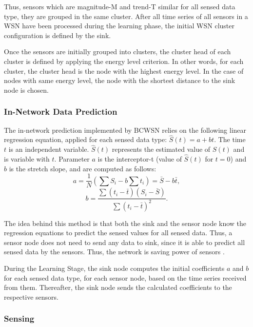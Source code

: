 \documentclass{acm_proc_article-sp}
\begin{document}
Thus, sensors which are magnitude-M and trend-T similar for all sensed data
type, they are grouped in the same cluster. After all time series of all sensors
in a WSN have been processed during the learning phase, the initial WSN cluster
configuration is defined by the sink.

Once the sensors are initially grouped into clusters, the cluster head of each
cluster is defined by applying the energy level criterion.
In other words, for each cluster, the cluster head is the node with the highest
energy level. In the case of nodes with same energy level, the node with the
shortest distance to the sink node is chosen.


\subsubsection{In-Network Data Prediction}
\label{data-predict}

The in-network prediction implemented by BCWSN relies on the
following linear regression equation, applied for each sensed data type:
$\hat{S}(t) = a + bt$.
The time $t$ is an independent variable. $\hat{S}(t)$ represents the estimated
value of $S(t)$ and is variable with $t$. Parameter $a$ is the interceptor-t
(value of $\hat{S}(t)$ for $t=0$) and $b$ is the stretch slope, and are computed
as follows:
\begin{equation}
	a = \frac{1}{N}\left(\sum S_{i} - b\sum t_{i} \right) = \bar{S} - b\bar{t},
\end{equation}
\vspace*{-.3cm}
\begin{equation}
	b = \frac{\sum \left(t_{i} - \bar{t}\right)\left(S_{i} - \bar{S}\right)}{\sum \left(t_{i} - \bar{t}\right)^{2}}.
\end{equation}

The idea behind this method is that both the sink and the sensor node know the
regression equations to predict the sensed values for all sensed data. Thus, a
sensor node does not need to send any data to sink, since it is able to predict
all sensed data by the sensors. Thus, the network is saving power of sensors
\cite{MaiaACR2013}.

During the Learning Stage, the sink node computes the initial coefficients $a$
and $b$ for each sensed data type, for each sensor node, based on the time
series received from them. Thereafter, the sink node sends the calculated
coefficients to the respective sensors.

 
\subsubsection{Sensing}
\end{document}
